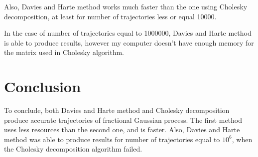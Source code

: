 \documentclass[12pt,titlepage]{article}
\begin{document}
Also, Davies and Harte method works much faster than the one using Cholesky decomposition, at least for number of trajectories less or equal 10000. 

In the case of number of trajectories equal to 1000000, Davies and Harte method is able to produce results, however my computer doesn't have enough memory for the matrix used in Cholesky algorithm. 


\section{Conclusion}

To conclude, both Davies and Harte method and Cholesky decomposition produce accurate trajectories of fractional Gaussian process. The first method uses less resources than the second one, and is faster. Also, Davies and Harte method was able to produce results for number of trajectories equal to $10^6$, when the Cholesky decomposition algorithm failed.
\end{document}
